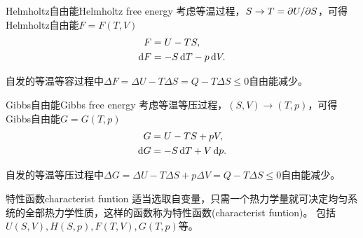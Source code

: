 \begin{definition}
	{Helmholtz自由能}{Helmholtz free energy}
	考虑等温过程，$S \to T = \partial U/\partial S$，可得Helmholtz自由能$F = F(T,V)$
	\begin{subequations}
		\begin{align}
			F &= U - TS,\\
			\mathop{}\!\mathrm{d} F &= -S\mathop{}\!\mathrm{d} T - p\mathop{}\!\mathrm{d} V.
		\end{align}
	\end{subequations}
\end{definition}

\begin{corollary}
	自发的等温等容过程中$\Delta F = \Delta U - T\Delta S = Q - T\Delta S \leq 0$自由能减少。
\end{corollary}

\begin{definition}
	{Gibbs自由能}{Gibbs free energy}
	考虑等温等压过程，$(S,V) \to (T,p)$，可得Gibbs自由能$G = G(T,p)$
	\begin{subequations}
		\begin{align}
			G &= U - TS + pV,\\
			\mathop{}\!\mathrm{d} G &= -S\mathop{}\!\mathrm{d} T + V\mathop{}\!\mathrm{d} p.
		\end{align}
	\end{subequations}
\end{definition}

\begin{corollary}
	自发的等温等压过程中$\Delta G = \Delta U - T\Delta S + p\Delta V = Q - T\Delta S \leq 0$自由能减少。
\end{corollary}

\begin{definition}{特性函数}{characterist funtion}
	适当选取自变量，只需一个热力学量就可决定均匀系统的全部热力学性质，这样的函数称为特性函数(characterist funtion)。
	包括$U(S,V),H(S,p),F(T,V),G(T,p)$等。
\end{definition}

